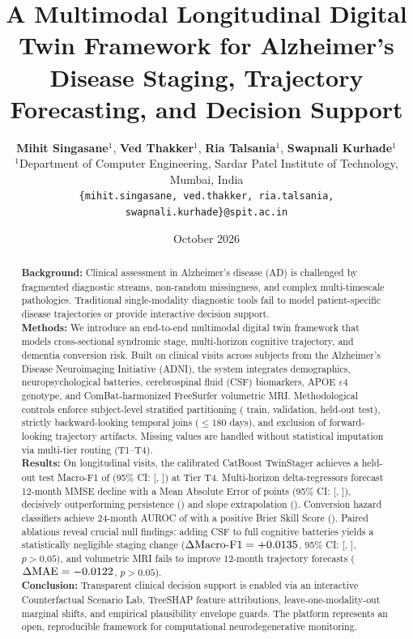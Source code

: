 \documentclass[11pt,a4paper]{article}
\title{\textbf{A Multimodal Longitudinal Digital Twin Framework for Alzheimer's Disease Staging, Trajectory Forecasting, and Decision Support}}
\author{
  \textbf{Mihit Singasane}$^{1}$, \textbf{Ved Thakker}$^{1}$, \textbf{Ria Talsania}$^{1}$, \textbf{Swapnali Kurhade}$^{1}$ \\[0.5em]
  $^{1}$Department of Computer Engineering, Sardar Patel Institute of Technology, Mumbai, India \\
  \texttt{\{mihit.singasane, ved.thakker, ria.talsania, swapnali.kurhade\}@spit.ac.in}
}
\date{October 2026}
\begin{document}
\maketitle

\begin{abstract}
\noindent\textbf{Background:} Clinical assessment in Alzheimer's disease (AD) is challenged by fragmented diagnostic streams, non-random missingness, and complex multi-timescale pathologies. Traditional single-modality diagnostic tools fail to model patient-specific disease trajectories or provide interactive decision support.\\
\textbf{Methods:} We introduce an end-to-end multimodal digital twin framework that models cross-sectional syndromic stage, multi-horizon cognitive trajectory, and dementia conversion risk. Built on \TotalRows{} clinical visits across \TotalSubjects{} subjects from the Alzheimer's Disease Neuroimaging Initiative (ADNI), the system integrates demographics, neuropsychological batteries, cerebrospinal fluid (CSF) biomarkers, APOE $\varepsilon4$ genotype, and ComBat-harmonized FreeSurfer volumetric MRI. Methodological controls enforce subject-level stratified partitioning (\TrainSubjects{} train, \ValSubjects{} validation, \TestSubjects{} held-out test), strictly backward-looking temporal joins ($\le 180$ days), and exclusion of forward-looking trajectory artifacts. Missing values are handled without statistical imputation via multi-tier routing (T1--T4).\\
\textbf{Results:} On \TotalRows{} longitudinal visits, the calibrated CatBoost TwinStager achieves a held-out test Macro-F1 of \StagerTFourFOne{} (95\% CI: [\StagerTFourFCILo{}, \StagerTFourFCIHi{}]) at Tier T4. Multi-horizon delta-regressors forecast 12-month MMSE decline with a Mean Absolute Error of \MMSEMAEXII{} points (95\% CI: [\MMSECILoXII{}, \MMSECIHiXII{}]), decisively outperforming persistence (\MMSEPersistXII{}) and slope extrapolation (\MMSESlopeXII{}). Conversion hazard classifiers achieve 24-month AUROC of \ConvAUCXXIV{} with a positive Brier Skill Score (\ConvBSSXXIV{}). Paired ablations reveal crucial null findings: adding CSF to full cognitive batteries yields a statistically negligible staging change ($\Delta\text{Macro-F1} = +0.0135{}$, 95\% CI: [\StagerDeltaCSFCILo{}, \StagerDeltaCSFCIHi{}], $p>0.05$), and volumetric MRI fails to improve 12-month trajectory forecasts ($\Delta\text{MAE} = -0.0122{}$, $p>0.05$).\\
\textbf{Conclusion:} Transparent clinical decision support is enabled via an interactive Counterfactual Scenario Lab, TreeSHAP feature attributions, leave-one-modality-out marginal shifts, and empirical plausibility envelope guards. The platform represents an open, reproducible framework for computational neurodegenerative monitoring.
\end{abstract}
\end{document}
